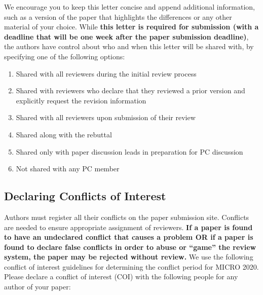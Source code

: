 \documentclass{sig-alternate}
\begin{document}
We encourage you to keep this letter concise and append additional information, such as a version of the paper that highlights the differences or any other material of your choice. While {\bf this letter is required for submission (with a deadline that will be one week after the paper submission deadline)}, the authors have control about who and when this letter will be shared with, by specifying one of the following options:

\begin{enumerate}
\item Shared with all reviewers during the initial review process
\item Shared with reviewers who declare that they reviewed a prior version and explicitly request the revision information
\item Shared with all reviewers upon submission of their review
\item Shared along with the rebuttal
\item Shared only with paper discussion leads in preparation for PC discussion
\item Not shared with any PC member
\end{enumerate}

\subsection{Declaring Conflicts of Interest}
Authors must register all their conflicts on the paper submission site. Conflicts are needed to ensure appropriate assignment of reviewers. {\bf If a paper is found to have an undeclared conflict that causes a problem OR if a paper is found to declare false conflicts in order to abuse or ``game'' the review system, the paper may be rejected without review.} We use the following conflict of interest guidelines for determining the conflict period for MICRO 2020.  Please declare a conflict of interest (COI) with the following people for any author of your paper:
\end{document}
